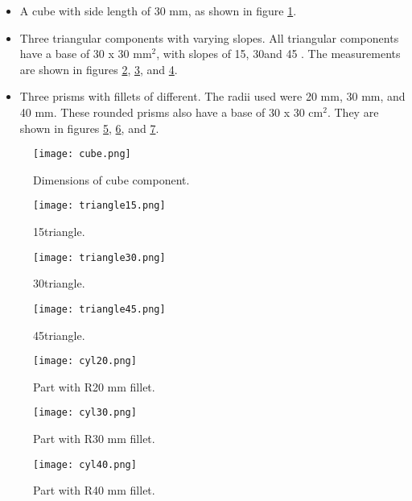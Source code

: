 \documentclass[../main.tex]{subfiles}
\begin{document}
\begin{itemize}
  \item A cube with side length of 30 mm, as shown in figure \ref{fig:cube}.
  \item Three triangular components with varying slopes. All triangular components have a base of 30 x 30 mm$^2$, with slopes of 15\degree, 30\degree and 45 \degree. The measurements are shown in figures \ref{fig:tri15}, \ref{fig:tri30},  and \ref{fig:tri45}.
  \item Three prisms with fillets of different. The radii used were 20 mm, 30 mm, and 40 mm. These rounded prisms also have a base of 30 x 30 cm$^2$. They are shown in figures \ref{fig:cyl20}, \ref{fig:cyl30}, and \ref{fig:cyl40}.
\end{itemize}

\begin{figure}
	\begin{center}
		\texttt{[image: cube.png]}
	\end{center}
	\caption{Dimensions of cube component.}\label{fig:cube}
\end{figure}
\begin{figure}
	\begin{center}
		\texttt{[image: triangle15.png]}
	\end{center}
	\caption{15\degree triangle.}\label{fig:tri15}
\end{figure}
\begin{figure}
	\begin{center}
		\texttt{[image: triangle30.png]}
	\end{center}
	\caption{30\degree triangle.}\label{fig:tri30}
\end{figure}
\begin{figure}
	\begin{center}
		\texttt{[image: triangle45.png]}
	\end{center}
	\caption{45\degree triangle.}\label{fig:tri45}
\end{figure}
\begin{figure}
	\begin{center}
		\texttt{[image: cyl20.png]}
	\end{center}
	\caption{Part with R20 mm fillet.}\label{fig:cyl20}
\end{figure}
\begin{figure}
	\begin{center}
		\texttt{[image: cyl30.png]}
	\end{center}
	\caption{Part with R30 mm fillet.}\label{fig:cyl30}
\end{figure}
\begin{figure}
	\begin{center}
		\texttt{[image: cyl40.png]}
	\end{center}
	\caption{Part with R40 mm fillet.}\label{fig:cyl40}
\end{figure}
\end{document}
